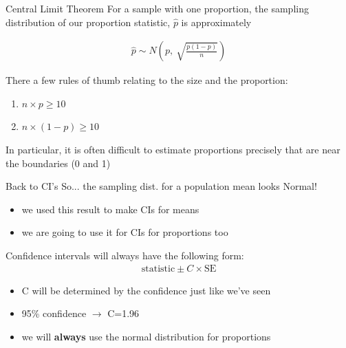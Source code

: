 \documentclass{beamer}
\begin{document}
\begin{frame}{Central Limit Theorem}
For a sample with one proportion, the sampling distribution of our proportion statistic, $\hat{p}$ is approximately

\begin{align*}
\hat{p} \sim  N \left( p, \ \sqrt{\frac{p(1-p)}{n}} \right)
\end{align*}

There a few rules of thumb relating to the size and the proportion:
\begin{enumerate}
\item $n \times p \geq 10$
\item $n \times (1-p) \geq 10$
\end{enumerate}
\vspace{3mm}
In particular, it is often difficult to estimate proportions precisely that are near the boundaries (0 and 1)
\end{frame}

\begin{frame}{Back to CI's}
So... the sampling dist. for a population mean looks Normal!
\begin{itemize}
    \item we used this result to make CIs for means
    \item we are going to use it for CIs for proportions too
\end{itemize} \vspace{6mm}


Confidence intervals will always have the following form:
\begin{align*}
    \text{statistic} \pm C \times \text{SE}
\end{align*}


\begin{itemize}
    \item C will be determined by the confidence just like we've seen
    \item 95\% confidence $\rightarrow$ C=1.96
    \item we will \textbf{always} use the normal distribution for proportions
\end{itemize}
\end{frame}
\end{document}
